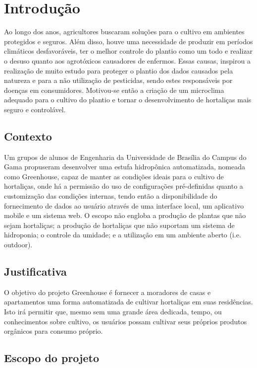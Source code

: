 \chapter[Introdução]{Introdução}

Ao longo dos anos, agricultores buscaram soluções para o cultivo em ambientes protegidos e seguros. Além disso, houve uma necessidade de produzir em períodos climáticos desfavoráveis, ter o melhor controle do plantio como um todo e realizar o desuso quanto aos agrotóxicos causadores de enfermos. Essas causas, inspirou a realização de muito estudo para proteger o plantio dos dados causados pela natureza e para a não utilização de pesticidas, sendo estes responsáveis por doenças em consumidores. Motivou-se então a criação de um microclima adequado para o cultivo do plantio e tornar o desenvolvimento de hortaliças mais seguro e controlável. 

\section{Contexto}
 
Um grupos de alunos de Engenharia da Universidade de Brasília do Campus do Gama propuseram desenvolver uma estufa hidropônica automatizada, nomeada como Greenhouse, capaz de manter as condições ideais para o cultivo de hortaliças, onde há a permissão do uso de configurações pré-definidas quanto a customização das condições internas, tendo então a disponibilidade do fornecimento de dados ao usuário através de uma interface local, um aplicativo mobile e um sistema
web. O escopo não engloba a produção de plantas que não sejam hortaliças; a produção de hortaliças que não suportam um sistema de hidroponia; o controle da umidade; e a utilização em um ambiente aberto (i.e. outdoor). 

\section{Justificativa}

O objetivo do projeto Greenhouse é fornecer a moradores de casas e apartamentos uma forma automatizada de cultivar hortaliças em suas residências. Isto irá permitir que, mesmo sem uma grande área dedicada, tempo, ou conhecimentos sobre cultivo, os usuários possam cultivar seus próprios produtos orgânicos para consumo próprio.

\section{Escopo do projeto}
